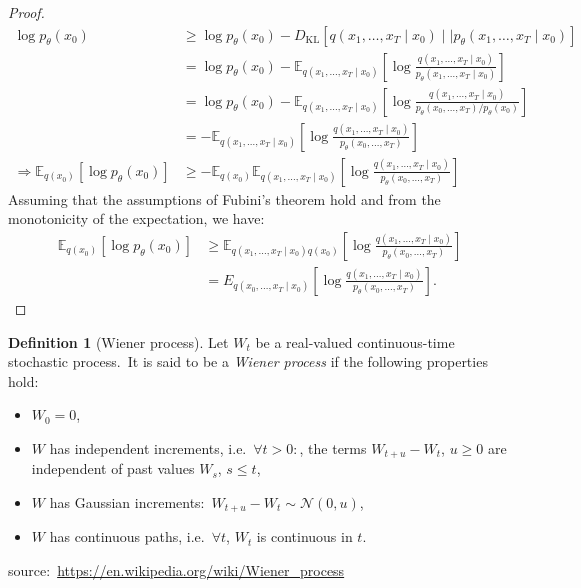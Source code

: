 \documentclass[12pt, a4paper]{article}
\numberwithin{equation}{section}
\theoremstyle{definition}
\theoremstyle{definition}
\newtheorem{defn}[thm]{Definition} %
\begin{document}
\begin{proof}
\cite{lilian_weng}
	\begin{align}
		\log p_{\theta}(x_{0}) &\geq \log p_{\theta}(x_{0}) - D_{\text{KL}}\left[ q(x_{1}, \dots, x_{T}\mid x_{0})\mid\mid p_{\theta}(x_{1}, \dots, x_{T}\mid x_{0}) \right]
		\\[4pt] &= \log p_{\theta}(x_{0}) - \mathbb E_{q(x_{1}, \dots, x_{T}\mid x_{0})}\left[\log\frac{q(x_{1}, \dots, x_{T}\mid x_{0})}{p_{\theta}(x_{1}, \dots, x_{T} \mid x_{0})}\right]
		\\[4pt] &= \log p_{\theta}(x_{0}) - \mathbb E_{q(x_{1}, \dots, x_{T}\mid x_{0})}\left[\log\frac{q(x_{1}, \dots, x_{T}\mid x_{0})}{p_{\theta}(x_{0}, \dots, x_{T})/ p_{\theta}(x_{0})}\right]
		\\[4pt] &= -\mathbb E_{q(x_{1}, \dots, x_{T}\mid x_{0})}\left[\log\frac{q(x_{1}, \dots, x_{T}\mid x_{0})}{p_{\theta}(x_{0}, \dots, x_{T})}\right]
		\\[4pt] \Rightarrow \mathbb E_{q(x_{0})}\left[\log p_{\theta}(x_{0})\right] &\geq -\mathbb E_{q(x_{0})}\mathbb E_{q(x_{1}, \dots, x_{T}\mid x_{0})}\left[\log\frac{q(x_{1}, \dots, x_{T}\mid x_{0})}{p_{\theta}(x_{0}, \dots, x_{T})}\right]
	\end{align}
	Assuming that the assumptions of Fubini's theorem hold and from the monotonicity of the expectation, we have: 
	\begin{align}\label{diff_elbo_to_be_proved}
		\mathbb E_{q(x_{0})}\left[ \log p_{\theta}(x_{0}) \right] &\geq \mathbb E_{q(x_{1}, \dots,  x_{T} \mid x_{0})q(x_{0})}\left[\log \frac{q(x_{1}, \dots, x_{T} \mid x_{0})}{p_{\theta}(x_{0}, \dots, x_{T})}\right] 
		\\ &= E_{q(x_{0}, \dots,  x_{T} \mid x_{0})}\left[\log \frac{q(x_{1}, \dots, x_{T} \mid x_{0})}{p_{\theta}(x_{0}, \dots, x_{T})}\right].
	\end{align}
\end{proof}

\begin{defn}[Wiener process]
	Let $W_{t}$ be a real-valued continuous-time stochastic process.\ It is said to be a \textit{Wiener process} if the following properties hold: 
	\begin{itemize}
		\item $W_{0} = 0$, 
		\item $W$ has independent increments, i.e.\ $\forall t > 0:$, the terms $W_{t+u} - W_{t}$, $u\geq 0$ are independent of past values $W_{s}$, $s\leq t$, 
		\item $W$ has Gaussian increments:\ $W_{t+u} - W_{t} \sim \mathcal N(0, u)$, 
		\item $W$ has continuous paths, i.e.\ $\forall t$, $W_{t}$ is continuous in $t$. 
	\end{itemize}
	source:\ \url{https://en.wikipedia.org/wiki/Wiener_process}
\end{defn}
\end{document}
